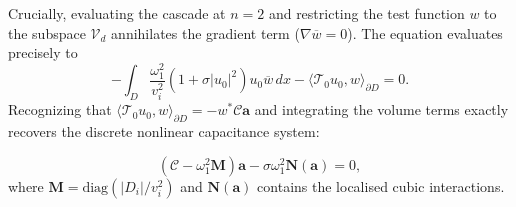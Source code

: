 \documentclass[a4paper,reqno,twoside]{amsart}
\numberwithin{equation}{section}
\theoremstyle{definition}
\newcommand{\<}{\ensuremath \leq}
\renewcommand{\>}{\ensuremath \geq}
\begin{document}
Crucially, evaluating the cascade at $n=2$ and restricting the test function $w$ to the subspace $\mathcal{V}_{d}$ annihilates the gradient term ($\nabla \overline{w} = 0$). The equation evaluates precisely to
\begin{equation}
    -\int_{D} \dfrac{\omega_1^2}{v_i^2}\left(1 + \sigma\lvert u_0\rvert^2\right)u_0\overline{w} \, dx - \langle \mathcal{T}_0 u_0, w\rangle_{\partial D} = 0. 
\end{equation}
Recognizing that $\langle \mathcal{T}_0 u_0, w \rangle_{\partial D} = -w^* \mathcal{C} \mathbf{a}$ and integrating the volume terms exactly recovers the discrete nonlinear capacitance system:

\begin{equation}\label{eq:discrete_nonlinear}
        (\mathcal{C} - \omega_1^2 \mathbf{M})\mathbf{a} - \sigma \omega_1^2 \mathbf{N}(\mathbf{a}) = 0,
\end{equation}
where $\mathbf{M} = \text{diag}(|D_i|/v_i^2)$ and $\mathbf{N}(\mathbf{a})$ contains the localised cubic interactions.
\end{document}
